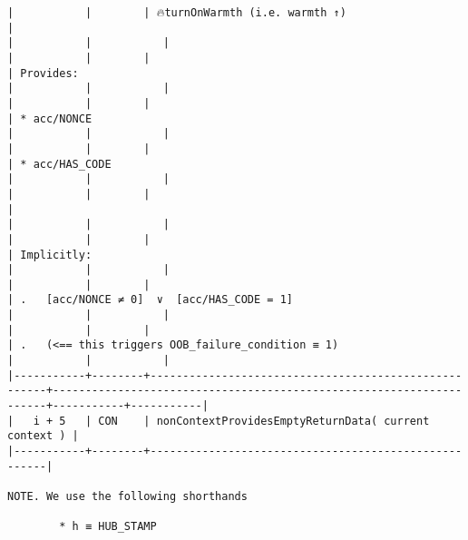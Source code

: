 \documentclass[varwidth=\maxdimen,margin=0.5cm,multi={verbatim}]{standalone}
\begin{document}
\begin{verbatim}
|           |        | 🔥turnOnWarmth (i.e. warmth ↑)                       |                                                                     |           |           |
|           |        |                                                      | Provides:                                                           |           |           |
|           |        |                                                      | * acc/NONCE                                                         |           |           |
|           |        |                                                      | * acc/HAS_CODE                                                      |           |           |
|           |        |                                                      |                                                                     |           |           |
|           |        |                                                      | Implicitly:                                                         |           |           |
|           |        |                                                      | .   [acc/NONCE ≠ 0]  ∨  [acc/HAS_CODE = 1]                          |           |           |
|           |        |                                                      | .   (<== this triggers OOB_failure_condition ≡ 1)                   |           |           |
|-----------+--------+------------------------------------------------------+---------------------------------------------------------------------+-----------+-----------|
|   i + 5   | CON    | nonContextProvidesEmptyReturnData( current context ) |
|-----------+--------+------------------------------------------------------|

NOTE. We use the following shorthands

        * h ≡ HUB_STAMP

\end{verbatim}
\end{document}
